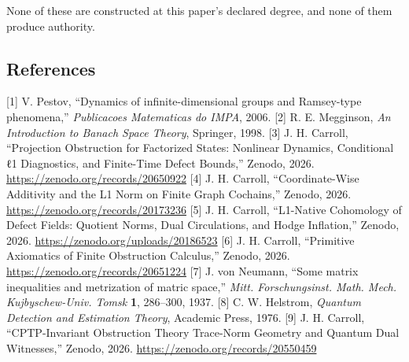 \documentclass[
  11pt,
]{article}
\begin{document}
None of these are constructed at this paper's declared degree, and none of them produce authority.

\subsection{References}\label{references}

{[}1{]} V. Pestov, ``Dynamics of infinite-dimensional groups and Ramsey-type phenomena,'' \emph{Publicacoes Matematicas do IMPA}, 2006.
{[}2{]} R. E. Megginson, \emph{An Introduction to Banach Space Theory}, Springer, 1998.
{[}3{]} J. H. Carroll, ``Projection Obstruction for Factorized States: Nonlinear Dynamics, Conditional ℓ1 Diagnostics, and Finite-Time Defect Bounds,'' Zenodo, 2026. \url{https://zenodo.org/records/20650922}
{[}4{]} J. H. Carroll, ``Coordinate-Wise Additivity and the L1 Norm on Finite Graph Cochains,'' Zenodo, 2026. \url{https://zenodo.org/records/20173236}
{[}5{]} J. H. Carroll, ``L1-Native Cohomology of Defect Fields: Quotient Norms, Dual Circulations, and Hodge Inflation,'' Zenodo, 2026. \url{https://zenodo.org/uploads/20186523}
{[}6{]} J. H. Carroll, ``Primitive Axiomatics of Finite Obstruction Calculus,'' Zenodo, 2026. \url{https://zenodo.org/records/20651224}
{[}7{]} J. von Neumann, ``Some matrix inequalities and metrization of matric space,'' \emph{Mitt. Forschungsinst. Math. Mech. Kujbyschew-Univ. Tomsk} \textbf{1}, 286--300, 1937.
{[}8{]} C. W. Helstrom, \emph{Quantum Detection and Estimation Theory}, Academic Press, 1976.
{[}9{]} J. H. Carroll, ``CPTP-Invariant Obstruction Theory Trace-Norm Geometry and Quantum Dual Witnesses,'' Zenodo, 2026. \url{https://zenodo.org/records/20550459}
\end{document}
